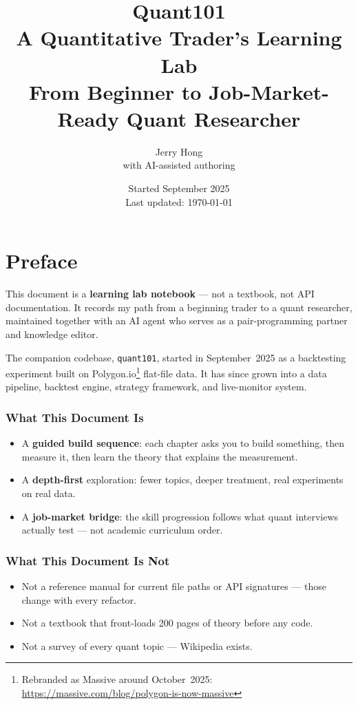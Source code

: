 \documentclass[a4paper, 11pt]{report}
\title{
    \textbf{Quant101} \\[0.5em]
    \Large A Quantitative Trader's Learning Lab \\[1em]
    \normalsize From Beginner to Job-Market-Ready Quant Researcher
}
\author{Jerry Hong \\ {\small with AI-assisted authoring}}
\date{Started September 2025 \\ Last updated: \today}
\theoremstyle{definition}
\theoremstyle{remark}
\begin{document}
\maketitle

\chapter*{Preface}

This document is a \textbf{learning lab notebook} --- not a textbook, not API
documentation.  It records my path from a beginning trader to a quant researcher,
maintained together with an AI agent who serves as a pair-programming partner and
knowledge editor.

The companion codebase, \texttt{quant101}, started in September~2025 as a
backtesting experiment built on Polygon.io\footnote{Rebranded as Massive around
October~2025: \url{https://massive.com/blog/polygon-is-now-massive}} flat-file
data.  It has since grown into a data pipeline, backtest engine, strategy
framework, and live-monitor system.

\subsection*{What This Document Is}

\begin{itemize}
    \item A \textbf{guided build sequence}: each chapter asks you to build
          something, then measure it, then learn the theory that explains the
          measurement.
    \item A \textbf{depth-first} exploration: fewer topics, deeper treatment,
          real experiments on real data.
    \item A \textbf{job-market bridge}: the skill progression follows what quant
          interviews actually test --- not academic curriculum order.
\end{itemize}

\subsection*{What This Document Is Not}

\begin{itemize}
    \item Not a reference manual for current file paths or API signatures --- those
          change with every refactor.
    \item Not a textbook that front-loads 200 pages of theory before any code.
    \item Not a survey of every quant topic --- Wikipedia exists.
\end{itemize}
\end{document}
